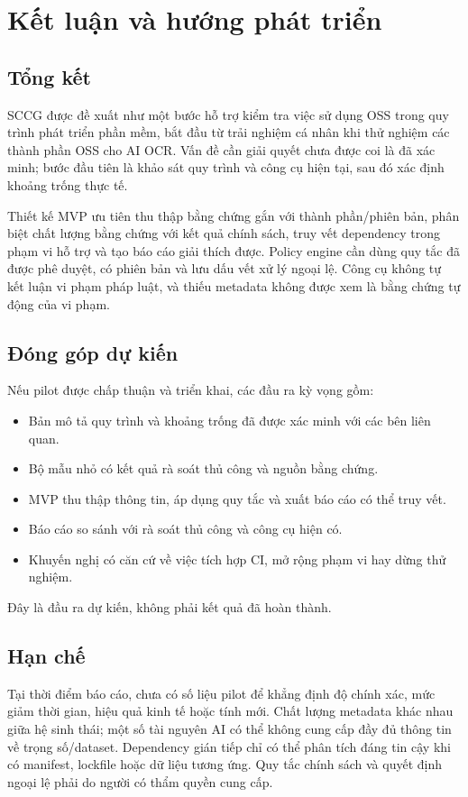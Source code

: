 \chapter{Kết luận và hướng phát triển}

\section{Tổng kết}
SCCG được đề xuất như một bước hỗ trợ kiểm tra việc sử dụng OSS trong quy trình phát triển phần mềm, bắt đầu từ trải nghiệm cá nhân khi thử nghiệm các thành phần OSS cho AI OCR. Vấn đề cần giải quyết chưa được coi là đã xác minh; bước đầu tiên là khảo sát quy trình và công cụ hiện tại, sau đó xác định khoảng trống thực tế.

Thiết kế MVP ưu tiên thu thập bằng chứng gắn với thành phần/phiên bản, phân biệt chất lượng bằng chứng với kết quả chính sách, truy vết dependency trong phạm vi hỗ trợ và tạo báo cáo giải thích được. Policy engine cần dùng quy tắc đã được phê duyệt, có phiên bản và lưu dấu vết xử lý ngoại lệ. Công cụ không tự kết luận vi phạm pháp luật, và thiếu metadata không được xem là bằng chứng tự động của vi phạm.

\section{Đóng góp dự kiến}
Nếu pilot được chấp thuận và triển khai, các đầu ra kỳ vọng gồm:
\begin{itemize}
    \item Bản mô tả quy trình và khoảng trống đã được xác minh với các bên liên quan.
    \item Bộ mẫu nhỏ có kết quả rà soát thủ công và nguồn bằng chứng.
    \item MVP thu thập thông tin, áp dụng quy tắc và xuất báo cáo có thể truy vết.
    \item Báo cáo so sánh với rà soát thủ công và công cụ hiện có.
    \item Khuyến nghị có căn cứ về việc tích hợp CI, mở rộng phạm vi hay dừng thử nghiệm.
\end{itemize}
Đây là đầu ra dự kiến, không phải kết quả đã hoàn thành.

\section{Hạn chế}
Tại thời điểm báo cáo, chưa có số liệu pilot để khẳng định độ chính xác, mức giảm thời gian, hiệu quả kinh tế hoặc tính mới. Chất lượng metadata khác nhau giữa hệ sinh thái; một số tài nguyên AI có thể không cung cấp đầy đủ thông tin về trọng số/dataset. Dependency gián tiếp chỉ có thể phân tích đáng tin cậy khi có manifest, lockfile hoặc dữ liệu tương ứng. Quy tắc chính sách và quyết định ngoại lệ phải do người có thẩm quyền cung cấp.

